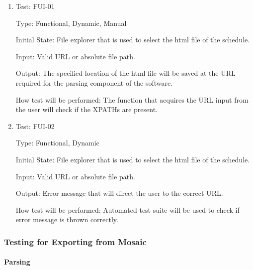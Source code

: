 \documentclass[12pt, titlepage]{article}
\begin{document}
\begin{enumerate}

\item{Test: FUI-01\\}

Type: Functional, Dynamic, Manual
					
Initial State:  File explorer that is used to select the html file of the schedule.
					
Input: Valid URL or absolute file path.

					
Output: The specified location of the html file will be saved at the URL required for the parsing component of the software.

					
How test will be performed: The function that acquires the URL input from the user will check if the XPATHs are present.

					
\item{Test: FUI-02\\}

Type: Functional, Dynamic
					
Initial State:  File explorer that is used to select the html file of the schedule.
					
Input: Valid URL or absolute file path.
					
Output: Error message that will direct the user to the correct URL.
					
How test will be performed: Automated test suite will be used to check if error message is thrown correctly.

\end{enumerate}

\subsubsection{Testing for Exporting from Mosaic}

\paragraph{Parsing}
\end{document}
